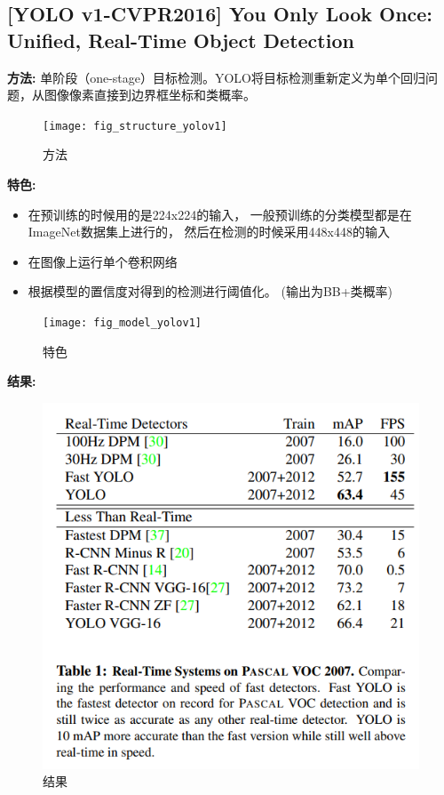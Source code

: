 \documentclass[a4paper, notitlepage]{article}
\begin{document}
\subsection{[YOLO v1-CVPR2016] You Only Look Once: Unified, Real-Time Object Detection}
\textbf{方法:}
单阶段（one-stage）目标检测。YOLO将目标检测重新定义为单个回归问题，从图像像素直接到边界框坐标和类概率。
\begin{figure}[H]
    \centering
    \texttt{[image: fig\_structure\_yolov1]}
    \caption{方法}
    \label{fig:example}
\end{figure}
\textbf{特色:}
\begin{itemize}
	\item 在预训练的时候用的是224x224的输入，
	一般预训练的分类模型都是在ImageNet数据集上进行的，
	然后在检测的时候采用448x448的输入
	\item 在图像上运行单个卷积网络
	\item 根据模型的置信度对得到的检测进行阈值化。
	(输出为BB+类概率) 
\end{itemize}
\begin{figure}[H]
    \centering
    \texttt{[image: fig\_model\_yolov1]}
    \caption{特色}
    \label{fig:example}
\end{figure}
\textbf{结果:}
\begin{figure}[H]
    \centering
    \includegraphics[scale=0.4]{fig_result_yolov1}
    \caption{结果}
    \label{fig:example}
\end{figure}
\end{document}
